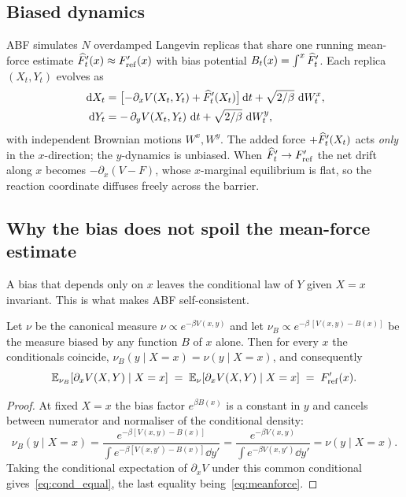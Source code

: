 \subsection{Biased dynamics}
ABF simulates $N$ overdamped Langevin replicas that share one running mean-force
estimate $\widehat{F}'_t(x)\approx F'_{\mathrm{ref}}(x)$ with bias potential
$B_t(x)=\int^x\widehat{F}'_t$. Each replica $(X_t,Y_t)$ evolves as
\begin{equation}
  \begin{aligned}
    \,\mathrm{d} X_t &= \bigl[-\partial_x V(X_t,Y_t) + \widehat{F}'_t(X_t)\bigr]\,\mathrm{d} t
              + \sqrt{2/\beta}\,\,\mathrm{d} W_t^x, \\
    \,\mathrm{d} Y_t &= -\,\partial_y V(X_t,Y_t)\,\,\mathrm{d} t
              + \sqrt{2/\beta}\,\,\mathrm{d} W_t^y,
  \end{aligned}
  \label{eq:abf_sde}
\end{equation}
with independent Brownian motions $W^x,W^y$. The added force $+\widehat{F}'_t(X_t)$
acts \emph{only} in the $x$-direction; the $y$-dynamics is unbiased. When
$\widehat{F}'_t\to F'_{\mathrm{ref}}$ the net drift along $x$ becomes $-\partial_x(V-F)$, whose
$x$-marginal equilibrium is flat, so the reaction coordinate diffuses freely
across the barrier.

\subsection{Why the bias does not spoil the mean-force estimate}
A bias that depends only on $x$ leaves the conditional law of $Y$ given $X=x$
invariant. This is what makes ABF self-consistent.

\begin{proposition}
\label{prop:cond_invariance}
Let $\nu$ be the canonical measure $\nu\propto e^{-\beta V(x,y)}$ and let
$\nu_B\propto e^{-\beta\,[V(x,y)-B(x)]}$ be the measure biased by any function
$B$ of $x$ alone. Then for every $x$ the conditionals coincide,
$\nu_B(y\mid X=x)=\nu(y\mid X=x)$, and consequently
\begin{equation}
  \mathbb{E}_{\nu_B}\!\left[\partial_x V(X,Y)\mid X=x\right]
  \;=\;
  \mathbb{E}_{\nu}\!\left[\partial_x V(X,Y)\mid X=x\right]
  \;=\; F'_{\mathrm{ref}}(x).
  \label{eq:cond_equal}
\end{equation}
\end{proposition}

\begin{proof}
At fixed $X=x$ the bias factor $e^{\beta B(x)}$ is a constant in $y$ and cancels
between numerator and normaliser of the conditional density:
\[
  \nu_B(y\mid X=x)
  = \frac{e^{-\beta[V(x,y)-B(x)]}}{\int e^{-\beta[V(x,y')-B(x)]}\dd y'}
  = \frac{e^{-\beta V(x,y)}}{\int e^{-\beta V(x,y')}\dd y'}
  = \nu(y\mid X=x).
\]
Taking the conditional expectation of $\partial_x V$ under this common
conditional gives~\eqref{eq:cond_equal}, the last equality
being~\eqref{eq:meanforce}.
\end{proof}

